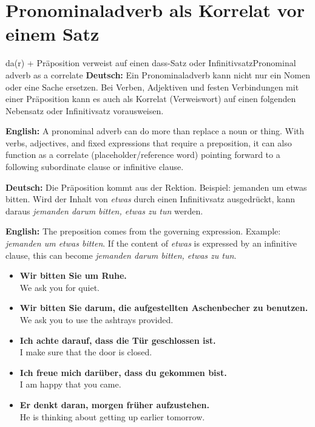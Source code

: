 \documentclass[a4paper,11pt]{article}
\newcommand{\GermanText}[1]{\textbf{Deutsch: }#1\par}
\newcommand{\EnglishText}[1]{{\small\color{SoftGray}\textbf{English: }#1\par}}
\newcommand{\ExampleItem}[2]{\item \textbf{#1}\\{\small\color{SoftGray}#2}}
\begin{document}
    
    \section{Pronominaladverb als Korrelat vor einem Satz}
        
        \begin{grammarentry}{da(r) + Präposition verweist auf einen dass-Satz oder Infinitivsatz}{Pronominal adverb as a correlate}
            \GermanText{Ein Pronominaladverb kann nicht nur ein Nomen oder eine Sache ersetzen. Bei Verben, Adjektiven und festen Verbindungen mit einer Präposition kann es auch als Korrelat (Verweiswort) auf einen folgenden Nebensatz oder Infinitivsatz vorausweisen.}
            \EnglishText{A pronominal adverb can do more than replace a noun or thing. With verbs, adjectives, and fixed expressions that require a preposition, it can also function as a correlate (placeholder/reference word) pointing forward to a following subordinate clause or infinitive clause.}
            
            \GermanText{Die Präposition kommt aus der Rektion. Beispiel: jemanden um etwas bitten. Wird der Inhalt von \emph{etwas} durch einen Infinitivsatz ausgedrückt, kann daraus \emph{jemanden darum bitten, etwas zu tun} werden.}
            \EnglishText{The preposition comes from the governing expression. Example: \emph{jemanden um etwas bitten}. If the content of \emph{etwas} is expressed by an infinitive clause, this can become \emph{jemanden darum bitten, etwas zu tun}.}
            
            \begin{exbox}
                \begin{itemize}
                    \ExampleItem{Wir bitten Sie um Ruhe.}{We ask you for quiet.}
                    \ExampleItem{Wir bitten Sie darum, die aufgestellten Aschenbecher zu benutzen.}{We ask you to use the ashtrays provided.}
                    \ExampleItem{Ich achte darauf, dass die Tür geschlossen ist.}{I make sure that the door is closed.}
                    \ExampleItem{Ich freue mich darüber, dass du gekommen bist.}{I am happy that you came.}
                    \ExampleItem{Er denkt daran, morgen früher aufzustehen.}{He is thinking about getting up earlier tomorrow.}
                \end{itemize}
            \end{exbox}
            

\end{grammarentry}
\end{document}
